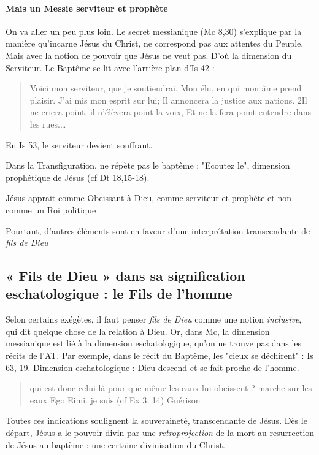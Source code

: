      \paragraph{Mais un Messie serviteur et prophète} On va aller un peu plus loin. Le secret messianique (Mc 8,30) s'explique par la manière qu'incarne Jésus du Christ, ne correspond pas aux attentes du Peuple. Mais avec la notion de pouvoir que Jésus ne veut pas. D'où la dimension du Serviteur.
     Le Baptême se lit avec l'arrière plan d'Is 42 : 
     \begin{quote}
         Voici mon serviteur, que je soutiendrai, Mon élu, en qui mon âme prend plaisir. J'ai mis mon esprit sur lui; Il annoncera la justice aux nations. 2Il ne criera point, il n'élèvera point la voix, Et ne la fera point entendre dans les rues.…
     \end{quote}
     En Is 53, le serviteur devient souffrant.
     
     Dans la Transfiguration,  ne répète pas le baptême : "Ecoutez le", dimension prophétique de Jésus (cf Dt 18,15-18).
     
     \begin{Synthesis}
     Jésus apprait comme Obeissant à Dieu, comme serviteur et prophète et non comme un Roi politique
     \end{Synthesis}
     Pourtant, d'autres éléments sont en faveur d'une interprétation transcendante de \textit{fils de Dieu}
     
    \subsection{« Fils de Dieu » dans sa signification eschatologique : le
    Fils de l'homme}
     Selon certains exégètes, il faut penser \textit{fils de Dieu} comme une notion \textit{inclusive}, qui dit quelque chose de la relation à Dieu. Or, dans Mc, la dimension messianique est lié à la dimension eschatologique, qu'on ne trouve pas dans les récits de l'AT. 
     Par exemple, dans le récit du Baptême, les "cieux se déchirent" : Is 63, 19. Dimension eschatologique : Dieu descend et se fait proche de l'homme. 
     
     \begin{quote}
         qui est donc celui là pour que même les eaux lui obeissent ?
         marche sur les eaux
         Ego Eimi. je suis (cf Ex 3, 14)
         Guérison
     \end{quote}
\begin{Synthesis}
    Toutes ces indications soulignent la souveraineté, transcendante de Jésus. Dès le départ, Jésus a le pouvoir divin par une \textit{retroprojection} de la mort au resurrection de Jésus au baptème : une certaine divinisation du Christ. 
\end{Synthesis}

